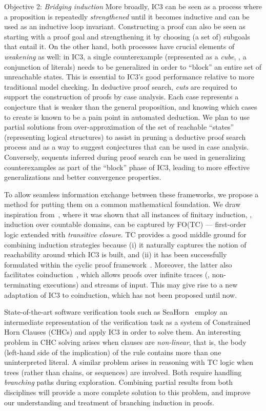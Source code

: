 \begin{paragraph}{Objective 2: {\it Bridging induction}}
More broadly, IC3 can be seen as a process where a proposition is repeatedly \emph{strengthened} until it becomes inductive and can be used as an inductive loop invariant.
Constructing a proof can also be seen as starting with a proof goal and strengthening it by choosing (a set of) subgoals that entail it.
On the other hand, both processes have crucial elements of \emph{weakening} as well: in IC3, a single counterexample (represented as a \emph{cube}, \ie, a conjunction of literals) needs to be generalized in order to ``block'' an entire set of unreachable states.
This is essential to IC3's good performance relative to more traditional model checking.
In deductive proof search, \emph{cuts} are required to support the construction of proofs by case analysis.
Each case represents a conjecture that is weaker than the general proposition, and knowing which  cases to create is known to be a pain point in automated deduction.
We plan to use partial solutions from over-approximation of the set of reachable ``states'' (representing logical structures) to assist in pruning a deductive proof search process and as a way to suggest conjectures that can be used in case analysis.
Conversely, sequents inferred during proof search can be used in generalizing counterexamples as part of the ``block'' phase of IC3, leading to more effective generalizations and better convergence properties.

To allow seamless information exchange between these frameworks, we propose a method for putting them on a common mathematical foundation.
We draw inspiration from~\cite{Book2003:Avron}, where it was shown that all instances of finitary induction, \ie, induction over countable domains, can be captured by FO(TC) --- first-order logic extended with \emph{transitive closure}.
TC provides a good middle ground for combining induction strategies because
(i) it naturally captures the notion of reachability around which IC3 is built, and
(ii) it has been successfully formulated within the cyclic proof framework~\cite{TOCL2020:Cohen}.
Moreover, the latter also facilitates coinduction~\cite{IJCAR2020:Cohen}, which allows proofs over infinite traces (\ie, non-terminating executions) and streams of input.
This may give rise to a new adaptation of IC3 to coinduction, which has not been proposed until now.

State-of-the-art software verification tools such as SeaHorn~\cite{TACAS2015:Gurfinkel} employ an intermediate representation of the verification task as a system of Constrained Horn Clauses (CHCs) %
and apply IC3 in order to solve them.
An interesting problem in CHC solving arises when clauses are \emph{non-linear}, that is, the body (left-hand side of the implication) of the rule contains more than one uninterpreted literal.
A similar problem arises in reasoning with TC logic when trees (rather than chains, or sequences) are involved.
Both require handling \emph{branching} paths during exploration.
Combining partial results from both disciplines will provide a more complete solution to this problem,
and improve our understanding and treatment of branching induction in proofs.


\end{paragraph}
